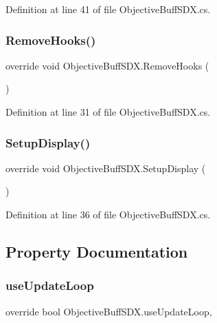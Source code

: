 Definition at line 41 of file Objective\+Buff\+S\+D\+X.\+cs.

\mbox{\label{class_objective_buff_s_d_x_a279a2332ce0ee68a1039d5f07b9d68a7}} 
\subsubsection{\texorpdfstring{RemoveHooks()}{RemoveHooks()}}
{\footnotesize\ttfamily override void Objective\+Buff\+S\+D\+X.\+Remove\+Hooks (\begin{DoxyParamCaption}{ }\end{DoxyParamCaption})}



Definition at line 31 of file Objective\+Buff\+S\+D\+X.\+cs.

\mbox{\label{class_objective_buff_s_d_x_ad43a50ad5cd6ef6d839c824cb8005790}} 
\subsubsection{\texorpdfstring{SetupDisplay()}{SetupDisplay()}}
{\footnotesize\ttfamily override void Objective\+Buff\+S\+D\+X.\+Setup\+Display (\begin{DoxyParamCaption}{ }\end{DoxyParamCaption})}



Definition at line 36 of file Objective\+Buff\+S\+D\+X.\+cs.



\subsection{Property Documentation}
\mbox{\label{class_objective_buff_s_d_x_a6d4d68538f8163ba4efb9017f2aac1bf}} 
\subsubsection{\texorpdfstring{useUpdateLoop}{useUpdateLoop}}
{\footnotesize\ttfamily override bool Objective\+Buff\+S\+D\+X.\+use\+Update\+Loop\hspace{0.3cm}{\ttfamily [get]}, {\ttfamily [protected]}}



